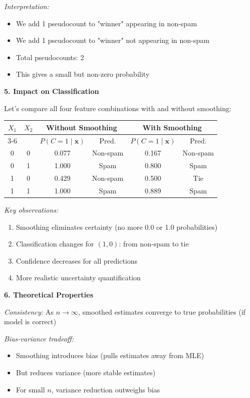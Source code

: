 \documentclass[12pt]{article}
\begin{document}
\begin{explanation}
\textit{Interpretation:}
\begin{itemize}
    \item We add 1 pseudocount to "winner" appearing in non-spam
    \item We add 1 pseudocount to "winner" not appearing in non-spam
    \item Total pseudocounts: 2
    \item This gives a small but non-zero probability
\end{itemize}

\textbf{5. Impact on Classification}

Let's compare all four feature combinations with and without smoothing:

\begin{center}
\begin{tabular}{|c|c|c|c|c|c|}
\hline
$X_1$ & $X_2$ & \multicolumn{2}{c|}{Without Smoothing} & \multicolumn{2}{c|}{With Smoothing} \\
\cline{3-6}
 &  & $P(C=1\mid\mathbf{x})$ & Pred. & $P(C=1\mid\mathbf{x})$ & Pred. \\
\hline
0 & 0 & 0.077 & Non-spam & 0.167 & Non-spam \\
0 & 1 & 1.000 & Spam & 0.800 & Spam \\
1 & 0 & 0.429 & Non-spam & 0.500 & Tie \\
1 & 1 & 1.000 & Spam & 0.889 & Spam \\
\hline
\end{tabular}
\end{center}

\textit{Key observations:}
\begin{enumerate}
    \item Smoothing eliminates certainty (no more 0.0 or 1.0 probabilities)
    \item Classification changes for $(1, 0)$: from non-spam to tie
    \item Confidence decreases for all predictions
    \item More realistic uncertainty quantification
\end{enumerate}

\textbf{6. Theoretical Properties}

\textit{Consistency:} As $n \to \infty$, smoothed estimates converge to true probabilities (if model is correct)

\textit{Bias-variance tradeoff:}
\begin{itemize}
    \item Smoothing introduces bias (pulls estimates away from MLE)
    \item But reduces variance (more stable estimates)
    \item For small $n$, variance reduction outweighs bias
\end{itemize}


\end{explanation}
\end{document}
